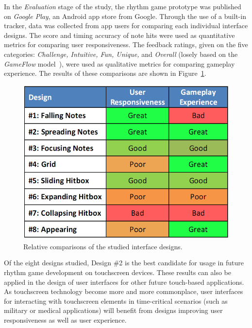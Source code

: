 \documentclass[annual]{acmsiggraph}
\begin{document}
In the \textit{Evaluation} stage of the study, the rhythm game prototype was published on \textit{Google Play}, an Android app store from Google. Through the use of a built-in tracker, data was collected from app users for comparing each individual interface designs. The score and timing accuracy of note hits were used as quantitative metrics for comparing user responsiveness. The feedback ratings, given on the five categories: \textit{Challenge, Intuitive, Fun, Unique,} and \textit{Overall} (losely based on the \textit{GameFlow} model~\cite{gameflow}), were used as qualitative metrics for comparing gameplay experience. The results of these comparisons are shown in Figure~\ref{fig:chart_results}.

\begin{figure}[htb!]
	\begin{center}
		\includegraphics[width=0.95\linewidth]{figure_chart_results}
	\end{center}
	\vspace{-6pt}
	\caption{Relative comparisons of the studied interface designs.}
	\label{fig:chart_results}
\end{figure}

Of the eight designs studied, Design \#2 is the best candidate for usage in future rhythm game development on touchscreen devices. These results can also be applied in the design of user interfaces for other future touch-based applications. As touchscreen technology become more and more commonplace, user interfaces for interacting with touchscreen elements in time-critical scenarios (such as military or medical applications) will benefit from designs improving user responsiveness as well as user experience.



\end{document}
